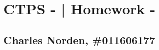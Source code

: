 \documentclass[12pt,letterpaper]{article}
\begin{document}
\section*{ CTPS - | Homework - }
\subsection*{ Charles Norden, \#011606177 }

\subsection*{}
\pagebreak

\subsection*{}
\pagebreak
\end{document}
